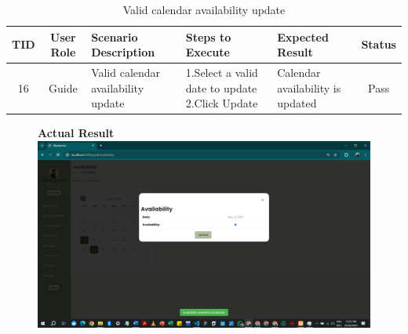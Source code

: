 \begin{table}[ht]
\centering
\begin{tabularx}{\textwidth}{|c|c|X|X|X|c|}
\hline
\textbf{TID} & \textbf{User Role} & \textbf{Scenario Description} & \textbf{Steps to Execute} & \textbf{Expected Result} & \textbf{Status} \\ \hline
16 & Guide & Valid calendar availability update & 1.Select a valid date to update \newline2.Click Update & Calendar availability 
 is updated & Pass \\ \hline
\end{tabularx}
\caption{Valid calendar availability update}
\end{table}

\begin{figure}[h!]
    \centering
    \textbf{Actual Result}
    \includegraphics[width=1\textwidth]{Images/Test Cases/16. change calendar availability.png}
\end{figure}
\clearpage





